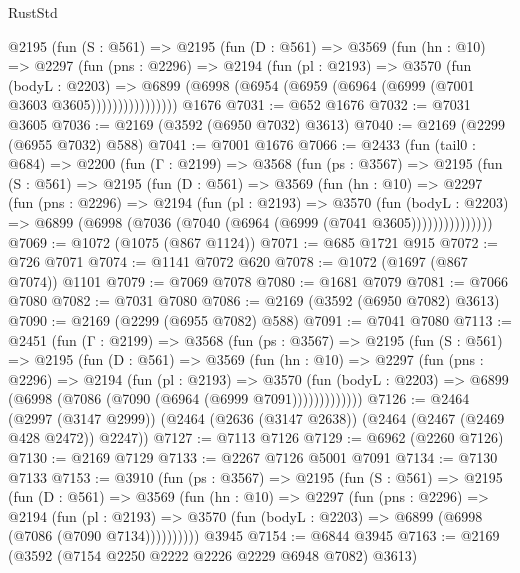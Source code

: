 \begin{lexlean}{RustStd}
\begin{coremodule}
{\begin{coremodule}
{{{{{{{{{{{{{{{          @2195
            (fun (S : @561) =>
            @2195
              (fun (D : @561) =>
              @3569
                (fun (hn : @10) =>
                @2297
                  (fun (pns : @2296) =>
                  @2194
                    (fun (pl : @2193) =>
                    @3570
                      (fun (bodyL : @2203) =>
                      @6899 (@6998 (@6954 (@6959 (@6964 (@6999 (@7001 @3603 @3605))))))))))))))))
    @1676
@7031 := @652 @1676
@7032 := @7031 @3605
@7036 := @2169 (@3592 (@6950 @7032) @3613)
@7040 := @2169 (@2299 (@6955 @7032) @588)
@7041 := @7001 @1676
@7066 := @2433
    (fun (tail0 : @684) =>
    @2200
      (fun (Γ : @2199) =>
      @3568
        (fun (ps : @3567) =>
        @2195
          (fun (S : @561) =>
          @2195
            (fun (D : @561) =>
            @3569
              (fun (hn : @10) =>
              @2297
                (fun (pns : @2296) =>
                @2194
                  (fun (pl : @2193) =>
                  @3570
                    (fun (bodyL : @2203) =>
                    @6899 (@6998 (@7036 (@7040 (@6964 (@6999 (@7041 @3605)))))))))))))))
@7069 := @1072 (@1075 (@867 @1124))
@7071 := @685 @1721 @915
@7072 := @726 @7071
@7074 := @1141 @7072 @620
@7078 := @1072 (@1697 (@867 @7074)) @1101
@7079 := @7069 @7078
@7080 := @1681 @7079
@7081 := @7066 @7080
@7082 := @7031 @7080
@7086 := @2169 (@3592 (@6950 @7082) @3613)
@7090 := @2169 (@2299 (@6955 @7082) @588)
@7091 := @7041 @7080
@7113 := @2451
    (fun (Γ : @2199) =>
    @3568
      (fun (ps : @3567) =>
      @2195
        (fun (S : @561) =>
        @2195
          (fun (D : @561) =>
          @3569
            (fun (hn : @10) =>
            @2297
              (fun (pns : @2296) =>
              @2194
                (fun (pl : @2193) =>
                @3570
                  (fun (bodyL : @2203) =>
                  @6899 (@6998 (@7086 (@7090 (@6964 (@6999 @7091)))))))))))))
@7126 := @2464
    (@2997 (@3147 @2999))
    (@2464 (@2636 (@3147 @2638)) (@2464 (@2467 (@2469 @428 @2472)) @2247))
@7127 := @7113 @7126
@7129 := @6962 (@2260 @7126)
@7130 := @2169 @7129
@7133 := @2267 @7126 @5001 @7091
@7134 := @7130 @7133
@7153 := @3910
    (fun (ps : @3567) =>
    @2195
      (fun (S : @561) =>
      @2195
        (fun (D : @561) =>
        @3569
          (fun (hn : @10) =>
          @2297
            (fun (pns : @2296) =>
            @2194
              (fun (pl : @2193) =>
              @3570 (fun (bodyL : @2203) => @6899 (@6998 (@7086 (@7090 @7134))))))))))
    @3945
@7154 := @6844 @3945
@7163 := @2169 (@3592 (@7154 @2250 @2222 @2226 @2229 @6948 @7082) @3613)
}}}}}}}}}}}}}}}
\end{coremodule}}
\end{coremodule}
\end{lexlean}
